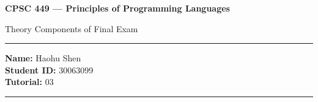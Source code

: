 \documentclass[11pt]{article}
\theoremstyle{definition}
\begin{document}
\begin{center}
{\bf \Large CPSC 449 --- Principles of Programming Languages

Theory Components of Final Exam}
\end{center}

\newenvironment{titlemize}[1]{%
  \paragraph{#1}
  \begin{itemize}}
  {\end{itemize}}
  
\hrule 	

\textbf{Name:} Haohu Shen \\
\textbf{Student ID:} 30063099 \\
\textbf{Tutorial:} 03 

\medskip \hrule
\end{document}
